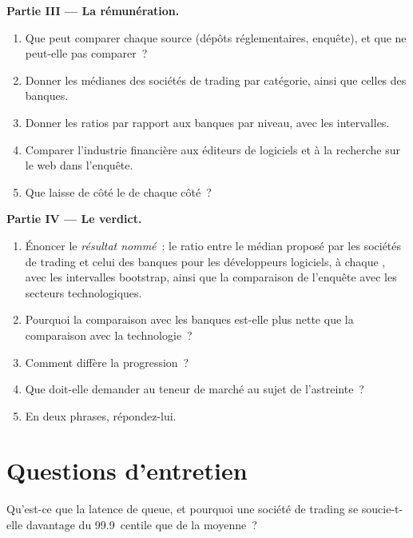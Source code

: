 \begin{problem}
\medskip\noindent\textbf{Partie III --- La rémunération.}
\begin{enumerate}[resume]
\item Que peut comparer chaque source (dépôts réglementaires, enquête), et que ne peut-elle pas comparer~?
\item Donner les médianes des sociétés de trading par catégorie, ainsi que celles des banques.
\item Donner les ratios par rapport aux banques par niveau, avec les intervalles.
\item Comparer l'industrie financière aux éditeurs de logiciels et à la recherche sur le web dans l'enquête.
\item Que laisse de côté le  de chaque côté~?
\end{enumerate}

\medskip\noindent\textbf{Partie IV --- Le verdict.}
\begin{enumerate}[resume]
\item Énoncer le \emph{résultat nommé}~: le ratio entre le  médian proposé par les sociétés de trading et celui des banques pour les développeurs logiciels,
à chaque , avec les intervalles bootstrap, ainsi que la comparaison de l'enquête avec les secteurs technologiques.
\item Pourquoi la comparaison avec les banques est-elle plus nette que la comparaison avec la technologie~?
\item Comment diffère la progression~?
\item Que doit-elle demander au teneur de marché au sujet de l'astreinte~?
\item En deux phrases, répondez-lui.
\end{enumerate}
\end{problem}

\section{Questions d'entretien}

\begin{interviewq}\label{iq:in:software-engineer:1}
Qu'est-ce que la latence de queue, et pourquoi une société de trading se soucie-t-elle davantage du 99.9~centile que de la moyenne~?
\end{interviewq}

